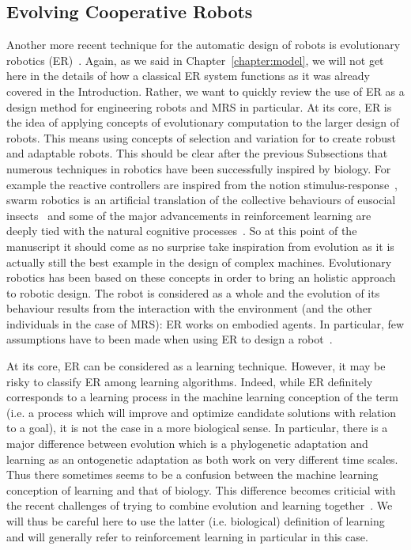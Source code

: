   \subsection{Evolving Cooperative Robots}

    Another more recent technique for the automatic design of robots is evolutionary robotics (ER)~\cite{Nolfi2000, Doncieux2015a}. Again, as we said in Chapter~\ref{chapter:model}, we will not get here in the details of how a classical ER system functions as it was already covered in the Introduction. Rather, we want to quickly review the use of ER as a design method for engineering robots and MRS in particular. At its core, ER is the idea of applying concepts of evolutionary computation to the larger design of robots. This means using concepts of selection and variation for to create robust and adaptable robots. This should be clear after the previous Subsections that numerous techniques in robotics have been successfully inspired by biology. For example the reactive controllers are inspired from the notion stimulus-response~\cite{Brooks1986}, swarm robotics is an artificial translation of the collective behaviours of eusocial insects~\cite{Bonabeau1999} and some of the major advancements in reinforcement learning are deeply tied with the natural cognitive processes~\cite{Montague1996}. So at this point of the manuscript it should come as no surprise take inspiration from evolution as it is actually still the best example in the design of complex machines. Evolutionary robotics has been based on these concepts in order to bring an holistic approach to robotic design. The robot is considered as a whole and the evolution of its behaviour results from the interaction with the environment (and the other individuals in the case of MRS): ER works on embodied agents. In particular, few assumptions have to been made when using ER to design a robot~\cite{Bongard2013a}.

    At its core, ER can be considered as a learning technique. However, it may be risky to classify ER among learning algorithms. Indeed, while ER definitely corresponds to a learning process in the machine learning conception of the term (i.e. a process which will improve and optimize candidate solutions with relation to a goal), it is not the case in a more biological sense. In particular, there is a major difference between evolution which is a phylogenetic adaptation and learning as an ontogenetic adaptation as both work on very different time scales. Thus there sometimes seems to be a confusion between the machine learning conception of learning and that of biology. This difference becomes criticial with the recent challenges of trying to combine evolution and learning together~\cite{Urzelai2001, Mouret2014, Doncieux2015a}. We will thus be careful here to use the latter (i.e. biological) definition of learning and will generally refer to reinforcement learning in particular in this case.

